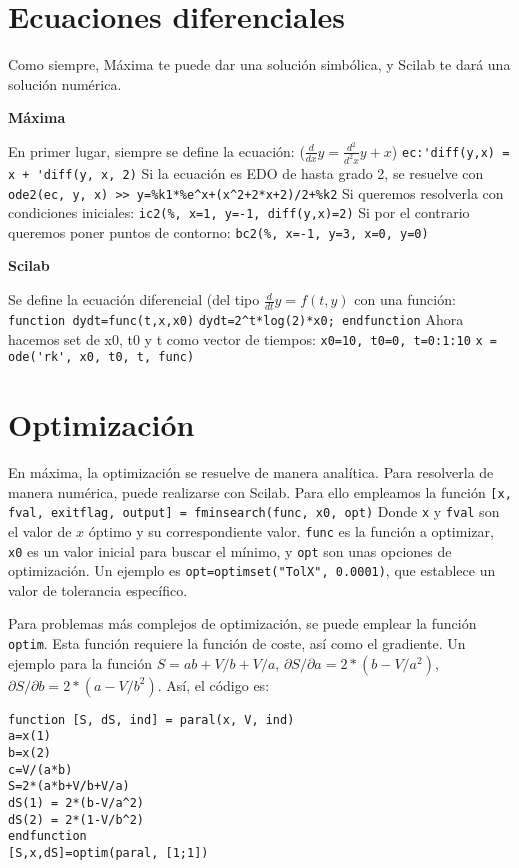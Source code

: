 \documentclass[a4paper]{article}
\begin{document}
\section{Ecuaciones diferenciales}
Como siempre, Máxima te puede dar una solución simbólica, y Scilab te dará una solución numérica.
\begin{multicols}{2}
	\begin{center}
		\textbf{Máxima}
	\end{center}
		En primer lugar, siempre se define la ecuación: ($\frac{d}{dx}y = \frac{d^2}{d^2x}y+x$)
		\verb|ec:'diff(y,x) = x + 'diff(y, x, 2)|
		Si la ecuación es EDO de hasta grado 2, se resuelve con 
		\verb|ode2(ec, y, x) >> y=%k1*%e^x+(x^2+2*x+2)/2+%k2|
		Si queremos resolverla con condiciones iniciales:
		\verb|ic2(%, x=1, y=-1, diff(y,x)=2)|
		Si por el contrario queremos poner puntos de contorno:
		\verb|bc2(%, x=-1, y=3, x=0, y=0)|
	\columnbreak
	
	\begin{center}
		\textbf{Scilab}
	\end{center}
	Se define la ecuación diferencial (del tipo $\frac{d}{dt}y=f(t,y)$ con una función:
	\verb|function dydt=func(t,x,x0)|
	\verb|dydt=2^t*log(2)*x0; endfunction|
	Ahora hacemos set de x0, t0 y t como vector de tiempos:
	\verb|x0=10, t0=0, t=0:1:10|
	\verb|x = ode('rk', x0, t0, t, func)|

\end{multicols}


\section{Optimización}
En máxima, la optimización se resuelve de manera analítica. Para resolverla de manera numérica, puede realizarse con Scilab.
Para ello empleamos la función \verb|[x, fval, exitflag, output] = fminsearch(func, x0, opt)|
Donde \verb|x| y \verb|fval| son el valor de $x$ óptimo y su correspondiente valor. \verb|func| es la función a optimizar, \verb|x0| es un valor inicial para buscar el mínimo, y \verb|opt| son unas opciones de optimización. Un ejemplo es \verb|opt=optimset("TolX", 0.0001)|, que establece un valor de tolerancia específico.

Para problemas más complejos de optimización, se puede emplear la función \verb|optim|. Esta función requiere la función de coste, así como el gradiente. Un ejemplo para la función $S = ab + V/b + V/a$, $\partial S/\partial a = 2*(b-V/a^2)$, $\partial S/\partial b = 2*(a-V/b^2)$. Así, el código es:
\begin{verbatim}
function [S, dS, ind] = paral(x, V, ind)
a=x(1)
b=x(2)
c=V/(a*b)
S=2*(a*b+V/b+V/a)
dS(1) = 2*(b-V/a^2)
dS(2) = 2*(1-V/b^2)
endfunction
[S,x,dS]=optim(paral, [1;1])
\end{verbatim}
\end{document}
